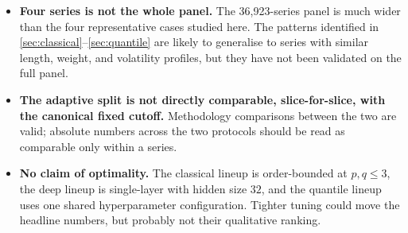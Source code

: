 \begin{itemize}
  \item \textbf{Four series is not the whole panel.} The 36{,}923-series panel is much wider than the four representative cases studied here. The patterns identified in \cref{sec:classical}--\cref{sec:quantile} are likely to generalise to series with similar length, weight, and volatility profiles, but they have not been validated on the full panel.
  \item \textbf{The adaptive split is not directly comparable, slice-for-slice, with the canonical fixed cutoff.} Methodology comparisons between the two are valid; absolute numbers across the two protocols should be read as comparable only within a series.
  \item \textbf{No claim of optimality.} The classical lineup is order-bounded at $p,q \le 3$, the deep lineup is single-layer with hidden size $32$, and the quantile lineup uses one shared hyperparameter configuration. Tighter tuning could move the headline numbers, but probably not their qualitative ranking.
\end{itemize}
